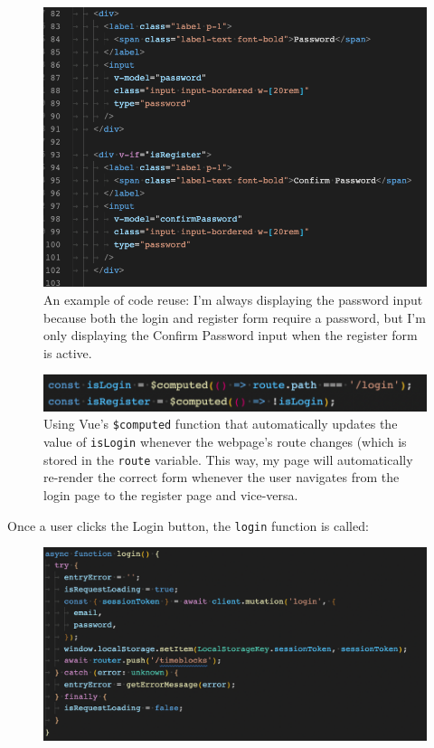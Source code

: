 \documentclass[notitlepage, 12pt]{report}
\newcommand{\code}[1]{\texttt{#1}}
\begin{document}
\begin{figure}[H]
	\centering
	\caption{An example of code reuse: I'm always displaying the password input because both the login and register form require a password, but I'm only displaying the Confirm Password input when the register form is active.}
	\includegraphics[width=\textwidth]{passwords.png}
\end{figure}

\begin{figure}[H]
	\centering
	\caption{Using Vue's \code{\$computed} function that automatically updates the value of \code{isLogin} whenever the webpage's route changes (which is stored in the \code{route} variable. This way, my page will automatically re-render the correct form whenever the user navigates from the login page to the register page and vice-versa.}
	\includegraphics[width=\textwidth]{frontend-entry-page-route.png}
\end{figure}

Once a user clicks the Login button, the \code{login} function is called:

\begin{figure}[H]
	\centering
	\includegraphics[width=\textwidth]{frontend-login-function.png}
\end{figure}
\end{document}
